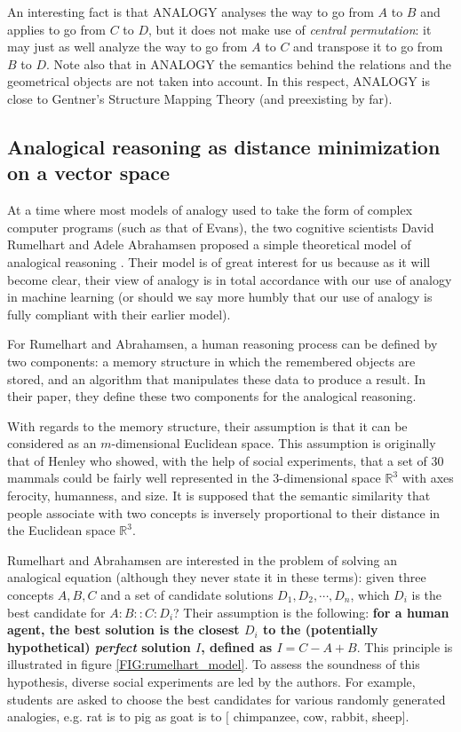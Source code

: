 An interesting fact is that ANALOGY analyses the way to go from $A$ to $B$ and
applies to go from $C$ to $D$, but it does not make use of \textit{central
permutation}: it may just as well analyze the way to go from $A$ to $C$ and
transpose it to go from $B$ to $D$. Note also that in ANALOGY the semantics
behind the relations and the geometrical objects are not taken into account. In
this respect, ANALOGY is close to Gentner's Structure Mapping Theory (and
preexisting by far).


\subsection{Analogical reasoning as distance minimization on a vector space}
\label{SEC:rumelhart_Abrahamsen}

At a time where most models of analogy used to take the form of complex computer
programs (such as that of Evans), the two cognitive scientists David Rumelhart
and Adele Abrahamsen proposed a simple theoretical model of analogical
reasoning \cite{RumAbr73}. Their model is of great interest for us because as
it will become clear, their view of analogy is in total accordance with our use
of analogy in machine learning (or should we say more humbly that our use of
analogy is fully compliant with their earlier model).

For Rumelhart and Abrahamsen, a human reasoning process can be defined by two
components: a memory structure in which the remembered objects are stored, and
an algorithm that manipulates these data to produce a result. In their paper,
they define these two components for the analogical reasoning.

With regards to the memory structure, their assumption is that it can be
considered as an $m$-dimensional Euclidean space. This assumption is originally
that of Henley \cite{Hen69} who showed, with the help of social experiments,
that a set of 30 mammals could be fairly well represented in the 3-dimensional
space $\mathbb{R}^3$ with axes ferocity, humanness, and size. It is supposed
that the semantic similarity that people associate with two concepts is
inversely proportional to their distance in the Euclidean space $\mathbb{R}^3$.

Rumelhart and Abrahamsen are interested in the problem of solving an analogical
equation (although they never state it in these terms): given three concepts
$A, B, C$ and a set of candidate solutions $D_1, D_2, \cdots, D_n$, which $D_i$
is the best candidate for $A:B::C:D_i$? Their assumption is the following:
\textbf{ for a human agent, the best solution is the closest $D_i$ to the
(potentially hypothetical) \textit{perfect} solution $I$, defined as $I = C - A
+ B$}. This principle is illustrated in figure \ref{FIG:rumelhart_model}.
To assess the soundness of this hypothesis, diverse social experiments are led
by the authors. For example, students are asked to choose the best candidates
for various randomly generated analogies, e.g. rat is to pig as goat is to $[$
chimpanzee, cow, rabbit, sheep$]$.

